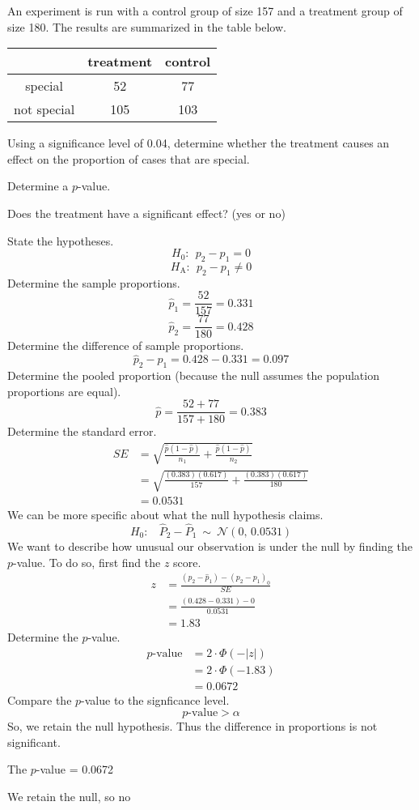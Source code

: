 
\begin{question}
An experiment is run with a control group of size 157 and a treatment
group of size 180. The results are summarized in the table below.

\begin{longtable}[c]{@{}ccc@{}}
\toprule
& treatment & control\tabularnewline
\midrule
\endhead
special & 52 & 77\tabularnewline
not special & 105 & 103\tabularnewline
\bottomrule
\end{longtable}

Using a significance level of 0.04, determine whether the treatment
causes an effect on the proportion of cases that are special.
\begin{answerlist}
  \item Determine a \(p\)-value.
  \item Does the treatment have a significant effect? (yes or no)
\end{answerlist}
\end{question}

\begin{solution}
State the hypotheses. \[H_0:~~ p_2-p_1 = 0 \]
\[H_\text{A}: ~~ p_2-p_1 \ne 0 \] Determine the sample proportions.
\[\hat{p}_1 = \frac{52}{157} = 0.331 \]
\[\hat{p}_2 = \frac{77}{180} = 0.428 \] Determine the difference of
sample proportions. \[\hat{p}_2-\hat{p}_1 = 0.428-0.331 = 0.097 \]
Determine the pooled proportion (because the null assumes the population
proportions are equal). \[ \hat{p} = \frac{52+77}{157+180} = 0.383 \]
Determine the standard error. \[
\begin{aligned}
SE &= \sqrt{\frac{\hat{p}(1-\hat{p})}{n_1}+\frac{\hat{p}(1-\hat{p})}{n_2}} \\[1em]
&= \sqrt{\frac{(0.383)(0.617)}{157}+\frac{(0.383)(0.617)}{180}} \\[1em]
&= 0.0531
\end{aligned}
\] We can be more specific about what the null hypothesis claims.
\[H_0:~~~~ \hat{P}_2-\hat{P}_1 ~\sim~ \mathcal{N}(0,\,0.0531)\] We want
to describe how unusual our observation is under the null by finding the
\(p\)-value. To do so, first find the \(z\) score. \[
\begin{aligned}
z &= \frac{(\hat{p}_2-\hat{p}_1)-(p_2-p_1)_0}{SE}\\
&= \frac{(0.428-0.331)-0}{0.0531} \\
&= 1.83
\end{aligned}
\] Determine the \(p\)-value. \[
\begin{aligned}
p\text{-value} &= 2\cdot \Phi(-|z|)\\
&= 2\cdot \Phi(-1.83)\\
&= 0.0672
\end{aligned}
\] Compare the \(p\)-value to the signficance level.
\[ p\text{-value} > \alpha \] So, we retain the null hypothesis. Thus
the difference in proportions is not significant.
\begin{answerlist}
  \item The \(p\)-value = 0.0672
  \item We retain the null, so no
\end{answerlist}
\end{solution}

